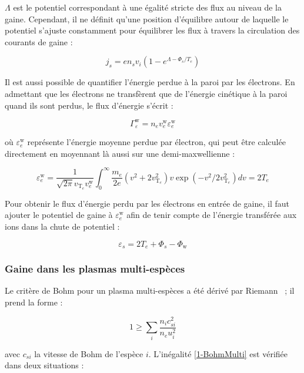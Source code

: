 \begin{refsection}
$\Lambda$ est le potentiel correspondant à une égalité stricte des flux au
niveau de la gaine. Cependant, il ne définit qu'une position
d'équilibre autour de laquelle le potentiel s'ajuste constamment pour
équilibrer les flux à travers la circulation des courants de gaine :

\begin{equation}
	j_{s}=en_{s}v_{i}\left(1-e^{\Lambda-\Phi_{s}/T_{e}}\right)
\end{equation}

Il est aussi possible de quantifier l'énergie perdue à la paroi par les
électrons. En admettant que les électrons ne transfèrent que de l'énergie
cinétique à la paroi quand ils sont perdus, le flux d'énergie s'écrit :

\begin{equation}
	\Gamma_\varepsilon^\text{w}=n_ev_{e}^\text{w}\varepsilon_e^\text{w}
\end{equation}

où $\varepsilon_e^\text{w}$ représente l'énergie moyenne perdue par électron,
qui peut être calculée directement en moyennant là aussi sur une
demi-maxwellienne :

\begin{equation}
	\varepsilon_e^\text{w}=\frac{1}{\sqrt{2\pi}v_{\text{T}_e}v_{e}^\text{w}}\int_0^\infty
	\frac{m_e}{2e}\left(v^2+2v_{\text{T}_e}^2\right)v\exp\left(-v^2/2v_{\text{T}_e}^2\right)dv
	=2T_e
\end{equation}

Pour obtenir le flux d'énergie perdu par les électrons en entrée de gaine, il
faut ajouter le potentiel de gaine à $\varepsilon_e^\text{w}$ afin de tenir
compte de l'énergie transférée aux ions dans la chute de potentiel :

\begin{equation}
	\varepsilon_s=2T_e+\Phi_s-\Phi_\text{w}
\end{equation}

\subsubsection{Gaine dans les plasmas multi-espèces}
Le critère de Bohm pour un plasma multi-espèces a été dérivé par
Riemann~\parencite{Riemann95} ; il prend la forme :

\begin{equation}
\label{1-BohmMulti}
1\geq\sum_i{\frac{n_ic_{si}^2}{n_eu_i^2}}
\end{equation}

avec $c_{si}$ la vitesse de Bohm de l'espèce $i$.
L'inégalité \eqref{1-BohmMulti} est vérifiée dans deux situations :


\end{refsection}
